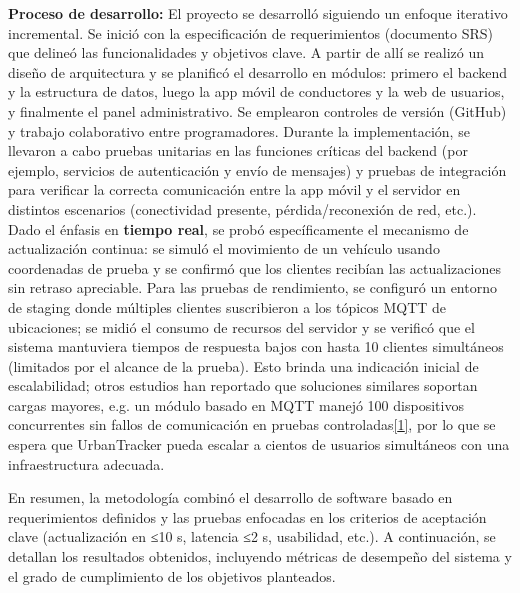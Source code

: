 \textbf{Proceso de desarrollo:} El proyecto se desarrolló siguiendo un enfoque iterativo incremental. Se inició con la especificación de requerimientos (documento SRS) que delineó las funcionalidades y objetivos clave. A partir de allí se realizó un diseño de arquitectura y se planificó el desarrollo en módulos: primero el backend y la estructura de datos, luego la app móvil de conductores y la web de usuarios, y finalmente el panel administrativo. Se emplearon controles de versión (GitHub) y trabajo colaborativo entre programadores. Durante la implementación, se llevaron a cabo pruebas unitarias en las funciones críticas del backend (por ejemplo, servicios de autenticación y envío de mensajes) y pruebas de integración para verificar la correcta comunicación entre la app móvil y el servidor en distintos escenarios (conectividad presente, pérdida/reconexión de red, etc.). Dado el énfasis en \textbf{tiempo real}, se probó específicamente el mecanismo de actualización continua: se simuló el movimiento de un vehículo usando coordenadas de prueba y se confirmó que los clientes recibían las actualizaciones sin retraso apreciable. Para las pruebas de rendimiento, se configuró un entorno de staging donde múltiples clientes suscribieron a los tópicos MQTT de ubicaciones; se midió el consumo de recursos del servidor y se verificó que el sistema mantuviera tiempos de respuesta bajos con hasta 10 clientes simultáneos (limitados por el alcance de la prueba). Esto brinda una indicación inicial de escalabilidad; otros estudios han reportado que soluciones similares soportan cargas mayores, e.g. un módulo basado en MQTT manejó 100 dispositivos concurrentes sin fallos de comunicación en pruebas controladas\href{https://fliphtml5.com/lqsof/cdpg/Art\%C3\%ADculos/\#:~:text=permitiendo\%20un\%20flujo\%20de\%20datos,del\%20sistema\%20fue\%20un\%20rigurosa}{{[}1{]}}, por lo que se espera que UrbanTracker pueda escalar a cientos de usuarios simultáneos con una infraestructura adecuada.

En resumen, la metodología combinó el desarrollo de software basado en requerimientos definidos y las pruebas enfocadas en los criterios de aceptación clave (actualización en ≤10 s, latencia ≤2 s, usabilidad, etc.). A continuación, se detallan los resultados obtenidos, incluyendo métricas de desempeño del sistema y el grado de cumplimiento de los objetivos planteados.
